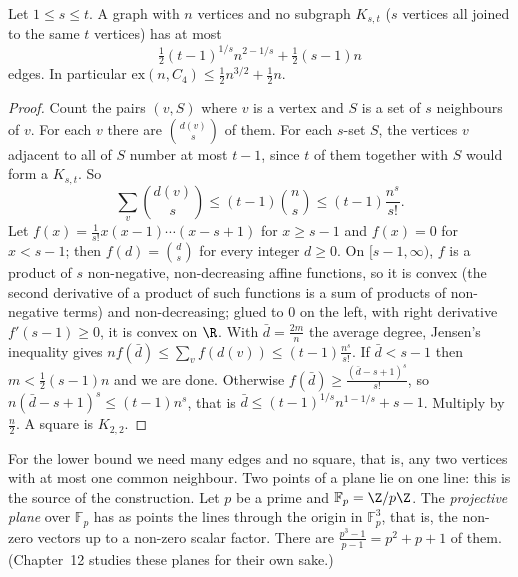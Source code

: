 \begin{theorem}\label{thm:kst}
Let $1\le s\le t$. A graph with $n$ vertices and no subgraph $K_{s,t}$ ($s$ vertices all joined to the same $t$ vertices) has at most
\[
\tfrac12(t-1)^{1/s}n^{2-1/s}+\tfrac12(s-1)n
\]
edges. In particular $\mathrm{ex}(n,C_4)\le\frac12n^{3/2}+\frac12n$.
\end{theorem}
\begin{proof}
Count the pairs $(v,S)$ where $v$ is a vertex and $S$ is a set of $s$ neighbours of $v$. For each $v$ there are $\binom{d(v)}s$ of them. For each $s$-set $S$, the
vertices $v$ adjacent to all of $S$ number at most $t-1$, since $t$ of them together with $S$ would form a $K_{s,t}$. So
\[
\sum_v\binom{d(v)}s\le(t-1)\binom ns\le(t-1)\frac{n^s}{s!}.
\]
Let $f(x)=\frac1{s!}x(x-1)\cdots(x-s+1)$ for $x\ge s-1$ and $f(x)=0$ for $x<s-1$; then $f(d)=\binom ds$ for every integer $d\ge0$. On $[s-1,\infty)$, $f$ is a product of
$s$ non-negative, non-decreasing affine functions, so it is convex (the second derivative of a product of such functions is a sum of products of
non-negative terms) and non-decreasing; glued to $0$ on the left, with right derivative $f'(s-1)\ge0$, it is convex on $\R$. With $\bar d=\frac{2m}n$ the
average degree, Jensen's inequality gives $nf(\bar d)\le\sum_vf(d(v))\le(t-1)\frac{n^s}{s!}$. If $\bar d<s-1$ then $m<\frac12(s-1)n$ and we are done. Otherwise
$f(\bar d)\ge\frac{(\bar d-s+1)^s}{s!}$, so $n(\bar d-s+1)^s\le(t-1)n^s$, that is $\bar d\le(t-1)^{1/s}n^{1-1/s}+s-1$. Multiply by $\frac n2$. A square is $K_{2,2}$.
\end{proof}

For the lower bound we need many edges and no square, that is, any two vertices with at most one common neighbour. Two points of a plane
lie on one line: this is the source of the construction. Let $p$ be a prime and $\mathbb F_p=\Z/p\Z$. The \emph{projective plane} over $\mathbb F_p$ has as
points the lines through the origin in $\mathbb F_p^3$, that is, the non-zero vectors up to a non-zero scalar factor. There are $\frac{p^3-1}{p-1}=p^2+p+1$
of them. (Chapter~12 studies these planes for their own sake.)

